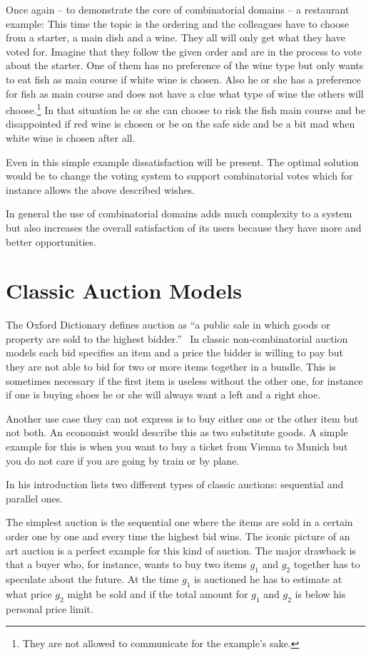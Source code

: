 \documentclass[a4paper]{paper}
\begin{document}
Once again -- to demonstrate the core of combinatorial domains -- a restaurant example: This time the topic is the ordering and the colleagues have to choose from a starter, a main dish and a wine. They all will only get what they have voted for. Imagine that they follow the given order and are in the process to vote about the starter. One of them has no preference of the wine type but only wants to eat fish as main course if white wine is chosen. Also he or she has a preference for fish as main course and does not have a clue what type of wine the others will choose.\footnote{They are not allowed to communicate for the example's sake.} In that situation he or she can choose to risk the fish main course and be disappointed if red wine is chosen or be on the safe side and be a bit mad when white wine is chosen after all. 

Even in this simple example dissatisfaction will be present. The optimal solution would be to change the voting system to support combinatorial votes which for instance allows the above described wishes.

In general the use of combinatorial domains adds much complexity to a system but also increases the overall satisfaction of its users because they have more and better opportunities.

\section{Classic Auction Models}

The Oxford Dictionary defines auction as ``a public sale in which goods or property are sold to the highest bidder.''~\cite{OD:auction} 
In classic non-combinatorial auction models each bid specifies an item and a price the bidder is willing to pay but they are not able to bid for two or more items together in a bundle. This is sometimes necessary if the first item is useless without the other one, for instance if one is buying shoes he or she will always want a left and a right shoe.

Another use case they can not express is to buy either one or the other item but not both. An economist would describe this as two substitute goods. A simple example for this is when you want to buy a ticket from Vienna to Munich but you do not care if you are going by train or by plane.

In his introduction \cite{San02} lists two different types of classic auctions: sequential and parallel ones.

The simplest auction is the sequential one where the items are sold in a certain order one by one and every time the highest bid wins. The iconic picture of an art auction is a perfect example for this kind of auction. The major drawback is that a buyer who, for instance, wants to buy two items $g_1$ and $g_2$ together has to speculate about the future. At the time $g_1$ is auctioned he has to estimate at what price $g_2$ might be sold and if the total amount for $g_1$ and $g_2$ is below his personal price limit.
\end{document}
